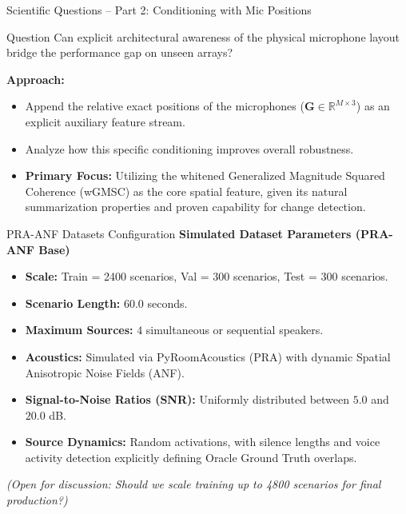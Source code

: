 \documentclass[8pt,hyperref={pdfpagelabels=true},xcolor=table,aspectratio=169]{beamer}
\begin{document}
\begin{frame}{Scientific Questions -- Part 2: Conditioning with Mic Positions}
    \begin{block}{Question}
        Can explicit architectural awareness of the physical microphone layout bridge the performance gap on unseen arrays?
    \end{block}
    \vspace{1em}
    \textbf{Approach:}
    \begin{itemize}
        \item Append the relative exact positions of the microphones ($\mathbf{G} \in \mathbb{R}^{M \times 3}$) as an explicit auxiliary feature stream.
        \item Analyze how this specific conditioning improves overall robustness.
        \item \textbf{Primary Focus:} Utilizing the whitened Generalized Magnitude Squared Coherence (wGMSC) as the core spatial feature, given its natural summarization properties and proven capability for change detection.
    \end{itemize}
\end{frame}

\begin{frame}{PRA-ANF Datasets Configuration}
    \textbf{Simulated Dataset Parameters (PRA-ANF Base)}
    \begin{itemize}
        \item \textbf{Scale:} Train = 2400 scenarios, Val = 300 scenarios, Test = 300 scenarios.
        \item \textbf{Scenario Length:} $60.0$ seconds.
        \item \textbf{Maximum Sources:} $4$ simultaneous or sequential speakers.
        \item \textbf{Acoustics:} Simulated via PyRoomAcoustics (PRA) with dynamic Spatial Anisotropic Noise Fields (ANF).
        \item \textbf{Signal-to-Noise Ratios (SNR):} Uniformly distributed between $5.0$ and $20.0$ dB.
        \item \textbf{Source Dynamics:} Random activations, with silence lengths and voice activity detection explicitly defining Oracle Ground Truth overlaps.
    \end{itemize}
    \vspace{1em}
    \textit{(Open for discussion: Should we scale training up to 4800 scenarios for final production?)}
\end{frame}
\end{document}
